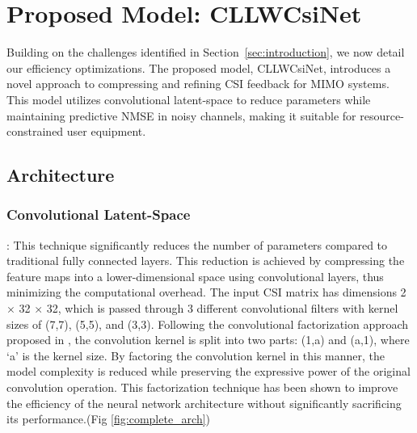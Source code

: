 \documentclass[lettersize,journal]{IEEEtran}
\begin{document}
\section{Proposed Model: CLLWCsiNet}
\label{sec:proposed_model}
Building on the challenges identified in Section~\ref{sec:introduction}, we now detail our efficiency optimizations.
The proposed model, CLLWCsiNet, introduces a novel approach to compressing and refining CSI feedback for MIMO systems. This model utilizes convolutional latent-space to reduce parameters while maintaining predictive NMSE in noisy channels, making it suitable for resource-constrained user equipment.

\subsection{Architecture}
\subsubsection{Convolutional Latent-Space}:
This technique significantly reduces the number of parameters compared to traditional fully connected layers. This reduction is achieved by compressing the feature maps into a lower-dimensional space using convolutional layers, thus minimizing the computational overhead. 
The input CSI matrix has dimensions 2 \begin{math} \times \end{math} 32 \begin{math} \times \end{math} 32, which is passed through 3 different convolutional filters with kernel sizes of (7,7), (5,5), and (3,3). Following the convolutional factorization approach proposed in \cite{abn}, the convolution kernel is split into two parts: (1,a) and (a,1), where ‘a’ is the kernel size. By factoring the convolution kernel in this manner, the model complexity is reduced while preserving the expressive power of the original convolution operation. This factorization technique has been shown to improve the efficiency of the neural network architecture without significantly sacrificing its performance.(Fig \ref{fig:complete_arch})
\end{document}
